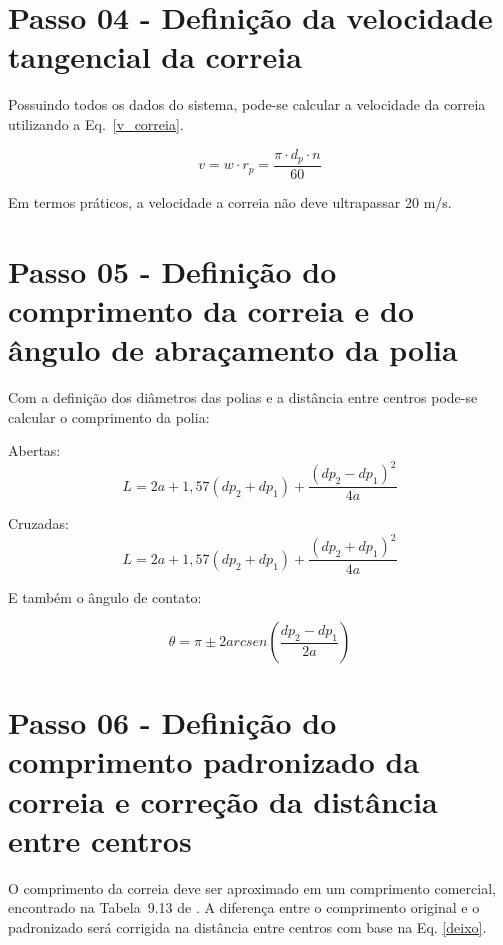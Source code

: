 \section{Passo 04 - Definição da velocidade tangencial da correia}

Possuindo todos os dados do sistema, pode-se calcular a velocidade da correia utilizando a Eq.~\eqref{v_correia}.

\begin{equation}
    v=w \cdot r_p=\frac{\pi \cdot d_p \cdot n}{60} \label{v_correia}
\end{equation}

Em termos práticos, a velocidade a correia não deve ultrapassar 20 m/s.

\section{Passo 05 - Definição do comprimento da correia e do ângulo de abraçamento da polia}

Com a definição dos diâmetros das polias e a distância entre centros pode-se calcular o comprimento da polia:

Abertas:
\begin{equation}
    L=2a + 1,57(dp_2+dp_1)+ \frac{(dp_2-dp_1)^{2}}{4a} \label{comprimento_correia}
\end{equation}

\bigskip
Cruzadas:
\begin{equation}
    L=2a + 1,57(dp_2+dp_1)+ \frac{(dp_2+dp_1)^{2}}{4a}
\end{equation}

\bigskip
E também o ângulo de contato:

\begin{equation}
    \theta=\pi \pm 2arcsen \left( \frac{dp_2 - dp_1}{2a} \right)
\end{equation}



\section{Passo 06 - Definição do comprimento padronizado da correia e correção da distância entre centros}

O comprimento da correia deve ser aproximado em um comprimento comercial, encontrado na Tabela~9.13 de \cite{EMA_Barbieri}. A diferença entre o comprimento original e o padronizado será corrigida na distância entre centros com base na Eq. \eqref{deixo}.

